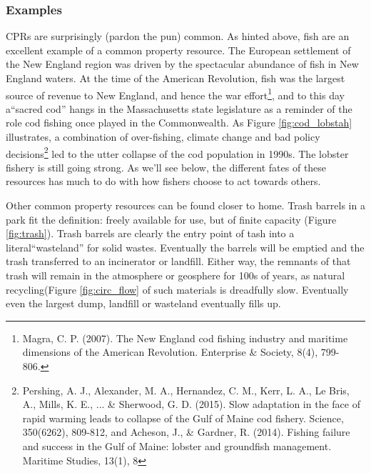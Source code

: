 \documentclass[amstex,12pt]{book}
\begin{document}
\subsubsection{Examples}
CPRs are surprisingly (pardon the pun) common. As hinted above, fish are an excellent example of a common property resource. The European settlement of the New England region was driven by the spectacular abundance of fish in New England waters. At the time of the American Revolution, fish was the largest source of revenue to New England, and hence the war effort\footnote{Magra, C. P. (2007). The New England cod fishing industry and maritime dimensions of the American Revolution. Enterprise \& Society, 8(4), 799-806.}, and to this day a``sacred cod'' hangs in the Massachusetts state legislature as a reminder of the role cod fishing once played in the Commonwealth. As Figure \ref{fig:cod_lobstah} illustrates, a combination of over-fishing, climate change and bad policy decisions\footnote{Pershing, A. J., Alexander, M. A., Hernandez, C. M., Kerr, L. A., Le Bris, A., Mills, K. E., ... \& Sherwood, G. D. (2015). Slow adaptation in the face of rapid warming leads to collapse of the Gulf of Maine cod fishery. Science, 350(6262), 809-812, and Acheson, J., \& Gardner, R. (2014). Fishing failure and success in the Gulf of Maine: lobster and groundfish management. Maritime Studies, 13(1), 8} led to the utter collapse of the cod population in 1990s. The lobster fishery is still going strong. As we'll see below, the different fates of these resources has much to do with how fishers choose to act towards others.

Other common property resources can be found closer to home. Trash barrels in a park fit the definition:  freely available for use, but of finite capacity (Figure \ref{fig:trash}). Trash barrels are clearly the entry point of tash into a literal``wasteland'' for solid wastes. Eventually the barrels will be emptied and the trash transferred to an incinerator or landfill. Either way, the remnants of that trash will remain in the atmosphere or geosphere for 100s of years, as natural recycling(Figure \ref{fig:circ_flow} of such materials is dreadfully slow. Eventually even the largest dump, landfill or wasteland eventually fills up.\\
\end{document}

